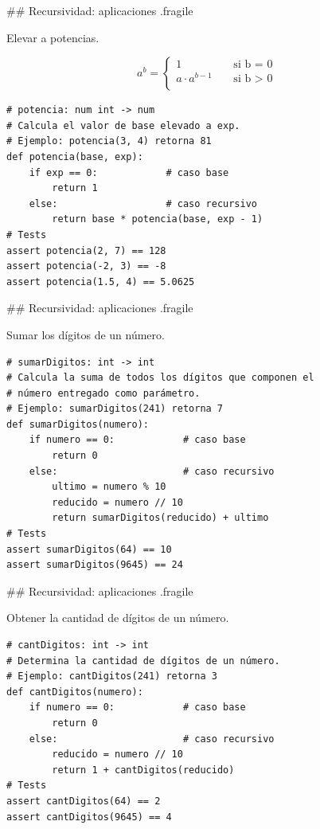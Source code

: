 ## Recursividad: aplicaciones {.fragile}

\bgncolumns
{}
\bgnblockgood
{} Elevar a potencias.
\trmblockgood

\vspace{-7ex}
$$ a^b = \begin{cases}
        1               & \;\;\;\;\text{si b = 0} \\
        a \cdot a^{b-1} & \;\;\;\;\text{si b > 0} \\
    \end{cases}
$$
\trmcolumns

\vspace{3ex}

\begin{lstlisting}[style=frame02]
# potencia: num int -> num
# Calcula el valor de base elevado a exp.
# Ejemplo: potencia(3, 4) retorna 81
def potencia(base, exp):
    if exp == 0:            # caso base
        return 1
    else:                   # caso recursivo
        return base * potencia(base, exp - 1)
# Tests
assert potencia(2, 7) == 128
assert potencia(-2, 3) == -8
assert potencia(1.5, 4) == 5.0625
\end{lstlisting}

## Recursividad: aplicaciones {.fragile}

\bgnblockgood
{} Sumar los dígitos de un número.
\trmblockgood

\pause

\begin{lstlisting}[style=frame02]
# sumarDigitos: int -> int
# Calcula la suma de todos los dígitos que componen el
# número entregado como parámetro.
# Ejemplo: sumarDigitos(241) retorna 7
def sumarDigitos(numero):
    if numero == 0:            # caso base
        return 0
    else:                      # caso recursivo
        ultimo = numero % 10
        reducido = numero // 10
        return sumarDigitos(reducido) + ultimo
# Tests
assert sumarDigitos(64) == 10
assert sumarDigitos(9645) == 24
\end{lstlisting}


## Recursividad: aplicaciones {.fragile}

\bgnblockgood
{} Obtener la cantidad de dígitos de un número.
\trmblockgood

\pause


\begin{lstlisting}[style=frame02]
# cantDigitos: int -> int
# Determina la cantidad de dígitos de un número.
# Ejemplo: cantDigitos(241) retorna 3
def cantDigitos(numero):
    if numero == 0:            # caso base
        return 0
    else:                      # caso recursivo
        reducido = numero // 10
        return 1 + cantDigitos(reducido)
# Tests
assert cantDigitos(64) == 2
assert cantDigitos(9645) == 4
\end{lstlisting}

